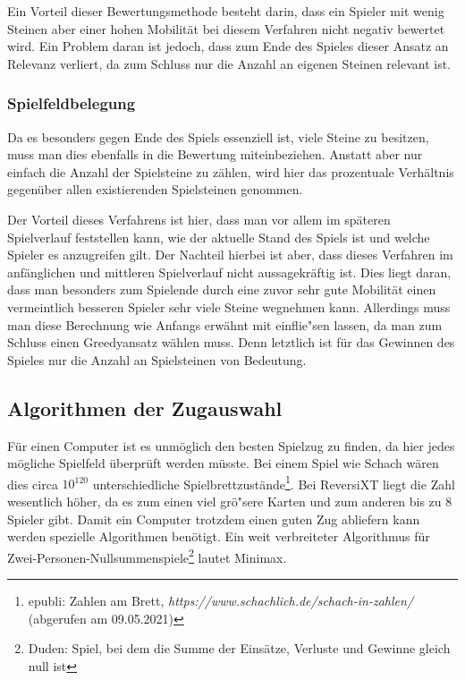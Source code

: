 Ein Vorteil dieser Bewertungsmethode besteht darin, dass ein Spieler mit wenig Steinen aber einer hohen Mobilit\"at bei diesem Verfahren nicht negativ bewertet wird.
Ein Problem daran ist jedoch, dass zum Ende des Spieles dieser Ansatz an Relevanz verliert, da zum Schluss nur die Anzahl an eigenen Steinen relevant ist.

\subsubsection{Spielfeldbelegung}\label{subsubsec:spielfeldbelegung}
Da es besonders gegen Ende des Spiels essenziell ist, viele Steine zu besitzen, muss man dies ebenfalls in die Bewertung miteinbeziehen.
Anstatt aber nur einfach die Anzahl der Spielsteine zu z\"ahlen, wird hier das prozentuale Verh\"altnis gegen\"uber allen existierenden Spielsteinen genommen.

Der Vorteil dieses Verfahrens ist hier, dass man vor allem im sp\"ateren Spielverlauf feststellen kann, wie der aktuelle Stand des Spiels ist und welche Spieler es anzugreifen gilt.
Der Nachteil hierbei ist aber, dass dieses Verfahren im anf\"anglichen und mittleren Spielverlauf nicht aussagekr\"aftig ist.
Dies liegt daran, dass man besonders zum Spielende durch eine zuvor sehr gute Mobilit\"at einen vermeintlich besseren Spieler sehr viele Steine wegnehmen kann.
Allerdings muss man diese Berechnung wie Anfangs erw\"ahnt mit einflie"sen lassen, da man zum Schluss einen Greedyansatz w\"ahlen muss.
Denn letztlich ist f\"ur das Gewinnen des Spieles nur die Anzahl an Spielsteinen von Bedeutung.

\subsection{Algorithmen der Zugauswahl}\label{subsec:algorithmen-der-zugauswahl}
F\"ur einen Computer ist es unm\"oglich den besten Spielzug zu finden, da hier jedes m\"ogliche Spielfeld \"uberpr\"uft werden m\"usste.
Bei einem Spiel wie Schach w\"aren dies circa $10^{120}$ unterschiedliche Spielbrettzust\"ande\footnote{epubli: Zahlen am Brett, \textit{https://www.schachlich.de/schach-in-zahlen/} (abgerufen am 09.05.2021)}.
Bei ReversiXT liegt die Zahl wesentlich h\"oher, da es zum einen viel gr\"o"sere Karten und zum anderen bis zu 8 Spieler gibt.
Damit ein Computer trotzdem einen guten Zug abliefern kann werden spezielle Algorithmen ben\"otigt.
Ein weit verbreiteter Algorithmus f\"ur Zwei-Personen-Nullsummenspiele\footnote{Duden: Spiel, bei dem die Summe der Einsätze, Verluste und Gewinne gleich null ist} lautet Minimax.

